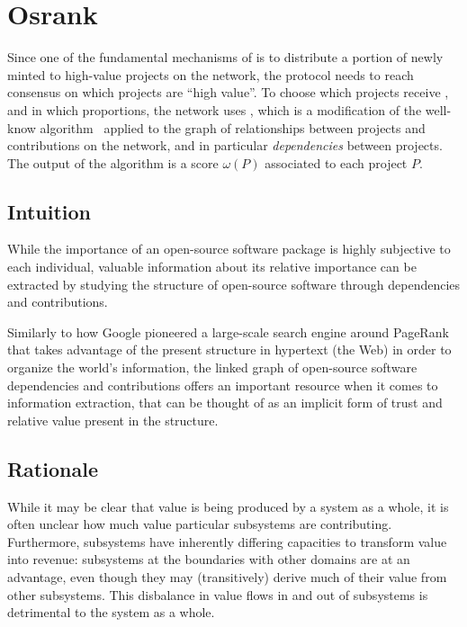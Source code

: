 \section{Osrank}
\label{s:osrank}

\def\Graph{\mathsf{Graph}}
\def\proj{\mathsf{proj}}
\def\contributor{\mathsf{account}}
\def\dep{\mathsf{depend}}
\def\own{\mathsf{maintain}}
\def\coown{\mathsf{maintain}^\circ}
\def\contrib{\mathsf{contrib}}
\def\cocontrib{\mathsf{contrib}^\circ}

Since one of the fundamental mechanisms of \oscoin{} is to distribute a portion
of newly minted \oscoin{} to high-value projects on the network, the protocol
needs to reach consensus on which projects are ``high value''. To choose which
projects receive \oscoin{}, and in which proportions, the network uses
\osrank{}, which is a modification of the well-know \pagerank{}
algorithm~\cite{pagerank} applied to the graph of relationships between
projects and contributions on the network, and in particular
\emph{dependencies} between projects. The output of the algorithm is a score
$\omega(P)$ associated to each project $P$.

\subsection{Intuition}

While the importance of an open-source software package is highly subjective to
each individual, valuable information about its relative importance can be
extracted by studying the structure of open-source software through
dependencies and contributions.

Similarly to how Google pioneered a large-scale search engine around PageRank
that takes advantage of the present structure in hypertext (the Web) in order
to organize the world’s information, the linked graph of open-source software
dependencies and contributions offers an important resource when it comes to information
extraction, that can be thought of as an implicit form of trust
and relative value present in the structure.

\subsection{Rationale}

While it may be clear that value is being produced by a system as a whole, it is
often unclear how much value particular subsystems are
contributing. Furthermore, subsystems have inherently differing capacities to
transform value into revenue: subsystems at the boundaries with other domains
are at an advantage, even though they may (transitively) derive much of their
value from other subsystems. This disbalance in value flows in and out of
subsystems is detrimental to the system as a whole.

